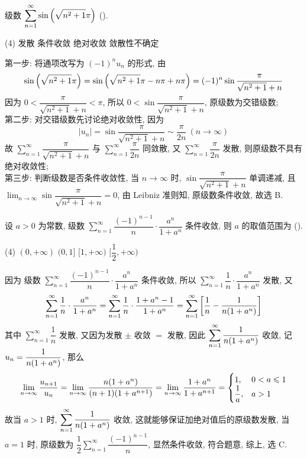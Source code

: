 \begin{example}
    级数 $\displaystyle \sum_{n=1}^{\infty} \sin\qty(\sqrt{n^2+1}\pi)$ (\quad).
    \begin{tasks}
        (4)
        \task 发散
        \task 条件收敛
        \task 绝对收敛
        \task 敛散性不确定
    \end{tasks}
\end{example}
\begin{solution}
    第一步: 将通项改写为 $(-1)^n u_n$ 的形式, 由 
    $$
    \sin\qty(\sqrt{n^2+1}\pi)=\sin\qty(\sqrt{n^2+1}\pi-n\pi+n\pi)=(-1)^n\sin\dfrac{\pi}{\sqrt{n^2+1}+n}
    $$
    因为 $0<\dfrac{\pi}{\sqrt{n^2+1}+n}<\pi$, 所以 $0<\sin\dfrac{\pi}{\sqrt{n^2+1}+n}$, 原级数为交错级数;\\ 
    第二步: 对交错级数先讨论绝对收敛性, 因为 
    $$
    |u_n|=\sin\dfrac{\pi}{\sqrt{n^2+1}+n}\sim \dfrac{\pi}{2n}~(n\to \infty)
    $$
    故 $ \displaystyle \sum_{n=1}^{\infty} \dfrac{\pi}{\sqrt{n^2+1}+n} $ 与 $ \displaystyle \sum_{n=1}^{\infty} \dfrac{\pi}{2n} $ 同敛散, 又 $ \displaystyle \sum_{n=1}^{\infty} \dfrac{\pi}{2n} $ 发散, 则原级数不具有绝对收敛性; \\ 
    第三步: 判断级数是否条件收敛性, 当 $n\to \infty$ 时, $\sin\dfrac{\pi}{\sqrt{n^2+1}+n}$ 单调递减, 且 $ \displaystyle \lim_{n \to \infty}\sin\dfrac{\pi}{\sqrt{n^2+1}+n} =0$, 由 Leibniz 准则知, 原级数条件收敛, 故选 B.
\end{solution}

\begin{example}
    设 $a>0$ 为常数, 级数 $ \displaystyle \sum_{n=1}^{\infty} \dfrac{(-1)^{n-1}}{n}\cdot \dfrac{a^n}{1+a^n} $ 条件收敛, 则 $a$ 的取值范围为 (\quad).
    \begin{tasks}(4)
        \task $(0,+\infty)$
        \task $(0,1]$
        \task $[1,+\infty)$
        \task $[\dfrac{1}{2},+\infty)$
    \end{tasks}
\end{example}
\begin{solution}
    因为 级数 $ \displaystyle \sum_{n=1}^{\infty} \dfrac{(-1)^{n-1}}{n}\cdot \dfrac{a^n}{1+a^n} $ 条件收敛, 所以 $\displaystyle \sum_{n=1}^{\infty} \dfrac{1}{n}\cdot\dfrac{a^n}{1+a^n}$ 发散, 
    又 $$
    \sum_{n=1}^{\infty} \dfrac{1}{n}\cdot\dfrac{a^n}{1+a^n}=\sum_{n=1}^{\infty} \dfrac{1}{n}\cdot\dfrac{1+a^n-1}{1+a^n}=\sum_{n=1}^{\infty} \qty[\dfrac{1}{n}-\dfrac{1}{n\qty(1+a^n)}]
    $$
    其中 $\displaystyle \sum_{n=1}^{\infty} \dfrac{1}{n}$ 发散, 又因为发散 $\pm$ 收敛 $=$ 发散, 因此 $ \displaystyle \sum_{n=1}^{\infty} \dfrac{1}{n\qty(1+a^n)} $ 收敛, 
    记 $u_n=\dfrac{1}{n\qty(1+a^n)}$, 那么 $$
    \lim_{n \to \infty}\dfrac{u_{n+1}}{u_n}=\lim_{n \to \infty}\dfrac{n\qty(1+a^n)}{(n+1)\qty(1+a^{n+1})}=\lim_{n \to \infty}\dfrac{1+a^n}{1+a^{n+1}}=\begin{cases}
        1,&0<a\leqslant 1\\ \dfrac{1}{a},&a>1
    \end{cases}
    $$
    故当 $a>1$ 时, $ \displaystyle \sum_{n=1}^{\infty} \dfrac{1}{n\qty(1+a^n)} $ 收敛, 这就能够保证加绝对值后的原级数发散, 当 $a=1$ 时, 原级数为 $ \displaystyle \dfrac{1}{2}\sum_{n=1}^{\infty} \dfrac{(-1)^{n-1}}{n} $, 显然条件收敛, 符合题意, 综上, 选 C.
\end{solution}

